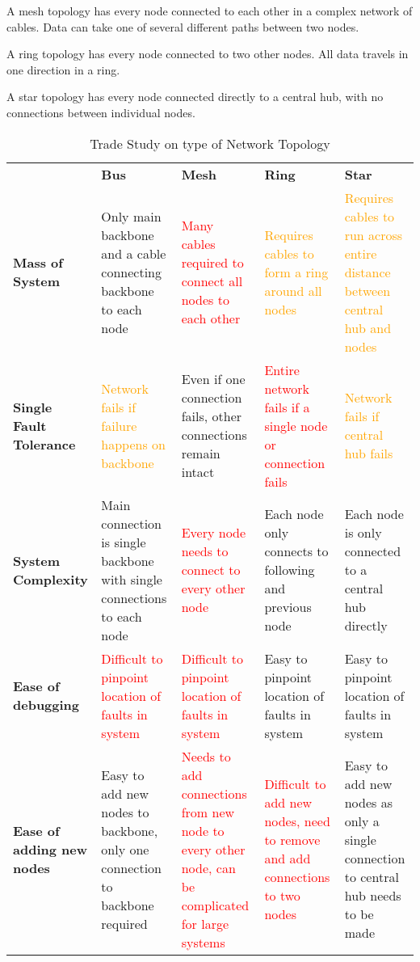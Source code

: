 A mesh topology has every node connected to each other in a complex network of cables. Data can take one of several different paths between two nodes.

A ring topology has every node connected to two other nodes. All data travels in one direction in a ring.

A star topology has every node connected directly to a central hub, with no connections between individual nodes.
\begin{table}[H]
\centering
\caption[Trade Study on type of Network Topology]{Trade Study on type of Network Topology\cite{studytopology}\cite{topology_intro}}
\begin{tabular}{|P{2.5cm}|P{3cm}|P{3cm}|P{3cm}|P{2.9cm}|}
\hline
	&	\textbf{Bus}	&	\textbf{Mesh}	&	\textbf{Ring}	&	\textbf{Star}	\\\hhline{|=|=|=|=|=|}
\textbf{Mass of System}	&
\textcolor{OliveGreen}{Only main backbone and a cable connecting backbone to each node}	&
\textcolor{red}{Many cables required to connect all nodes to each other}	&
\textcolor{orange}{Requires cables to form a ring around all nodes}	&
\textcolor{orange}{Requires cables to run across entire distance between central hub and nodes}	\\\hline
\textbf{Single Fault Tolerance}	&
\textcolor{orange}{Network fails if failure happens on backbone}	&
\textcolor{OliveGreen}{Even if one connection fails, other connections remain intact}	&
\textcolor{red}{Entire network fails if a single node or connection fails}	&
\textcolor{orange}{Network fails if central hub fails}	\\\hline
\textbf{System Complexity}	&
\textcolor{OliveGreen}{Main connection is single backbone with single connections to each node}	&
\textcolor{red}{Every node needs to connect to every other node}	&
\textcolor{OliveGreen}{Each node only connects to following and previous node}	&
\textcolor{OliveGreen}{Each node is only connected to a central hub directly}	\\\hline
\textbf{Ease of debugging}	&
\textcolor{red}{Difficult to pinpoint location of faults in system}	&
\textcolor{red}{Difficult to pinpoint location of faults in system}	&	
\textcolor{OliveGreen}{Easy to pinpoint location of faults in system}	&	
\textcolor{OliveGreen}{Easy to pinpoint location of faults in system}	\\\hline
\textbf{Ease of adding new nodes}	&
\textcolor{OliveGreen}{Easy to add new nodes to backbone, only one connection to backbone required}	&
\textcolor{red}{Needs to add connections from new node to every other node, can be complicated for large systems}	&
\textcolor{red}{Difficult to add new nodes, need to remove and add connections to two nodes}	&
\textcolor{OliveGreen}{Easy to add new nodes as only a single connection to central hub needs to be made}	\\\hline
\end{tabular}
\label{tab:networkto}
\end{table}
